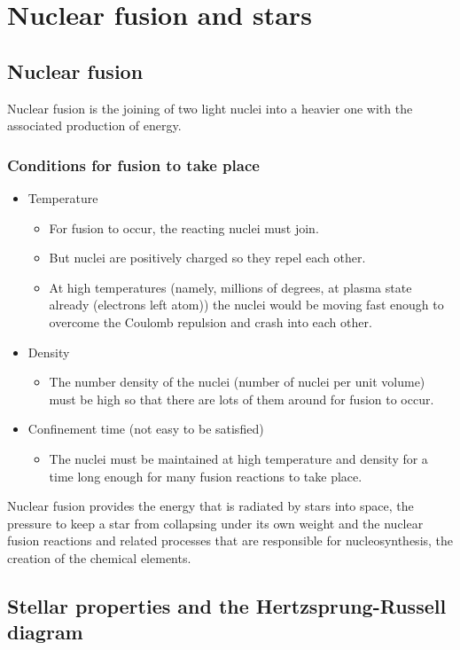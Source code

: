 \documentclass[a4paper,12pt]{article}
\begin{document}
\section{Nuclear fusion and stars}
\subsection{Nuclear fusion}
Nuclear fusion is the joining of two light nuclei into a heavier one with the associated production of energy. 
\subsubsection*{Conditions for fusion to take place}
\begin{itemize}
  \item Temperature
  \begin{itemize}
    \item For fusion to occur, the reacting nuclei must join. 
    \item But nuclei are positively charged so they repel each other.
    \item At high temperatures (namely, millions of degrees, at plasma state already (electrons left atom)) the nuclei would be moving fast enough to overcome the Coulomb repulsion and crash into each other.
  \end{itemize}
  \item Density
  \begin{itemize}
    \item The number density of the nuclei (number of nuclei per unit volume) must be high so that there are lots of them around for fusion to occur.
  \end{itemize}
  \item Confinement time (not easy to be satisfied)
  \begin{itemize}
    \item The nuclei must be maintained at high temperature and density for a time long enough for many fusion reactions to take place.
  \end{itemize}
\end{itemize}
Nuclear fusion provides the energy that is radiated by stars into space, the pressure to keep a star from collapsing under its own weight and the nuclear fusion reactions and related processes that are responsible for nucleosynthesis, the creation of the chemical elements. 
\subsection{Stellar properties and the Hertzsprung-Russell diagram}
\end{document}
